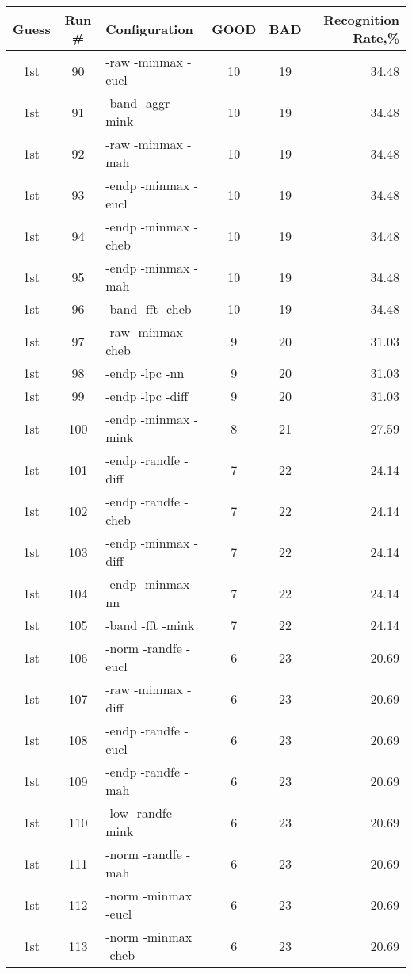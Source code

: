 \begin{table}
\begin{minipage}[b]{\textwidth}
\centering
\begin{tabular}{|c|c|l|c|c|r|} \hline
Guess & Run \# & Configuration & GOOD & BAD & Recognition Rate,\%\\ \hline\hline
1st & 90 & -raw -minmax -eucl  & 10 & 19 & 34.48\\ \hline
1st & 91 & -band -aggr -mink  & 10 & 19 & 34.48\\ \hline
1st & 92 & -raw -minmax -mah  & 10 & 19 & 34.48\\ \hline
1st & 93 & -endp -minmax -eucl  & 10 & 19 & 34.48\\ \hline
1st & 94 & -endp -minmax -cheb  & 10 & 19 & 34.48\\ \hline
1st & 95 & -endp -minmax -mah  & 10 & 19 & 34.48\\ \hline
1st & 96 & -band -fft -cheb  & 10 & 19 & 34.48\\ \hline
1st & 97 & -raw -minmax -cheb  & 9 & 20 & 31.03\\ \hline
1st & 98 & -endp -lpc -nn  & 9 & 20 & 31.03\\ \hline
1st & 99 & -endp -lpc -diff  & 9 & 20 & 31.03\\ \hline
1st & 100 & -endp -minmax -mink  & 8 & 21 & 27.59\\ \hline
1st & 101 & -endp -randfe -diff  & 7 & 22 & 24.14\\ \hline
1st & 102 & -endp -randfe -cheb  & 7 & 22 & 24.14\\ \hline
1st & 103 & -endp -minmax -diff  & 7 & 22 & 24.14\\ \hline
1st & 104 & -endp -minmax -nn  & 7 & 22 & 24.14\\ \hline
1st & 105 & -band -fft -mink  & 7 & 22 & 24.14\\ \hline
1st & 106 & -norm -randfe -eucl  & 6 & 23 & 20.69\\ \hline
1st & 107 & -raw -minmax -diff  & 6 & 23 & 20.69\\ \hline
1st & 108 & -endp -randfe -eucl  & 6 & 23 & 20.69\\ \hline
1st & 109 & -endp -randfe -mah  & 6 & 23 & 20.69\\ \hline
1st & 110 & -low -randfe -mink  & 6 & 23 & 20.69\\ \hline
1st & 111 & -norm -randfe -mah  & 6 & 23 & 20.69\\ \hline
1st & 112 & -norm -minmax -eucl  & 6 & 23 & 20.69\\ \hline
1st & 113 & -norm -minmax -cheb  & 6 & 23 & 20.69\\ \hline

\end{tabular}
\end{minipage}
\end{table}
